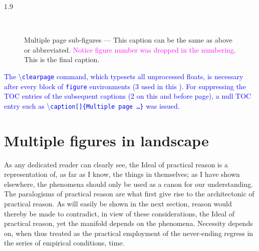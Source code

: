 \documentclass[phd]{ndsu-thesis-2022}
\newcommand\myspacing{1.9} %
\newcommand\italk[1]{\textcolor{blue}{#1}}  %
\newcommand\cmd[1]{\textbackslash\texttt{#1}}  %
\begin{document}
\begin{spacing}{\myspacing}
\begin{figure}[t]
\\
\captionsetup{singlelinecheck=false} %
\caption[]{Multiple page sub-figures --- This caption can be the same as above or abbreviated. \textcolor{magenta}{Notice figure number was dropped in the numbering}. This is the final caption.} 
\end{figure}

\italk{The \cmd{clearpage} command, which typesets all unprocessed floats, is necessary after every block of \texttt{figure} environments (3 used in this \Cref{fig:1gen}). For suppressing the TOC entries of the subsequent captions (2 on this and before page), a null TOC entry such as \cmd{caption[]\{Multiple page \ldots \}} was issued.}


\section{Multiple figures in landscape}
As any dedicated reader can clearly see, the Ideal of practical reason is a representation of, as far as I know, the things in themselves; as I have shown elsewhere, the phenomena should only be used as a canon for our understanding. The paralogisms of practical reason are what first give rise to the architectonic of practical reason. As will easily be shown in the next section, reason would thereby be made to contradict, in view of these considerations, the Ideal of practical reason, yet the manifold depends on the phenomena. Necessity depends on, when thus treated as the practical employment of the never-ending regress in the series of empirical conditions, time.


\end{spacing}
\end{document}
